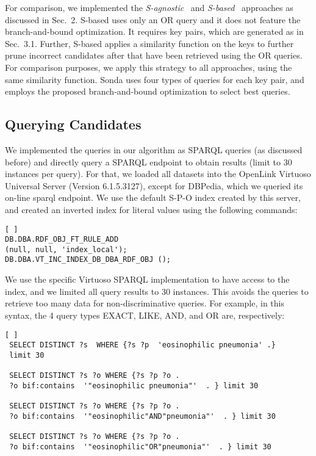 For comparison, we implemented the \emph{S-agnostic}~\cite{papadakis_efficient_2011} and \emph{S-based}~\cite{DBLP:conf/semweb/SongH11} approaches as discussed in Sec.~2. S-based uses only an OR query and it does not feature the branch-and-bound optimization. It requires key pairs, which are generated as in Sec.~3.1. Further, S-based applies a similarity function on the keys to further prune incorrect candidates after that have been retrieved using the OR queries. For comparison purposes, we apply this strategy to all approaches, using the same similarity function. Sonda uses four types of queries for each key pair, and employs the proposed branch-and-bound optimization to select best queries. 

\subsection{Querying Candidates} 
We implemented the queries in our algorithm as SPARQL queries (as discussed before) and directly query a SPARQL endpoint to obtain results (limit to 30 instances per query). For that, we loaded all datasets into the OpenLink Virtuoso Universal Server (Version 6.1.5.3127), except for DBPedia, which we queried its on-line sparql endpoint. We use the default S-P-O index created by this server, and created an inverted index for literal values using the following commands:

\lstset{basicstyle=\small}
\begin{lstlisting}[ ]   
DB.DBA.RDF_OBJ_FT_RULE_ADD 
(null, null, 'index_local');
DB.DBA.VT_INC_INDEX_DB_DBA_RDF_OBJ (); 
\end{lstlisting}

We use the specific Virtuoso SPARQL implementation to have access to the index, and we limited all query results to 30 instances. This avoids the queries to retrieve too many data for non-discriminative queries. For example, in this syntax, the 4 query types EXACT, LIKE, AND, and OR are, respectively: 
\lstset{basicstyle=\small}
\begin{lstlisting}[ ]   
 SELECT DISTINCT ?s  WHERE {?s ?p  'eosinophilic pneumonia' .} 
 limit 30
 
 SELECT DISTINCT ?s ?o WHERE {?s ?p ?o .
 ?o bif:contains  '"eosinophilic pneumonia"'  . } limit 30
 
 SELECT DISTINCT ?s ?o WHERE {?s ?p ?o .
 ?o bif:contains  '"eosinophilic"AND"pneumonia"'  . } limit 30
 
 SELECT DISTINCT ?s ?o WHERE {?s ?p ?o .
 ?o bif:contains  '"eosinophilic"OR"pneumonia"'  . } limit 30
\end{lstlisting}


